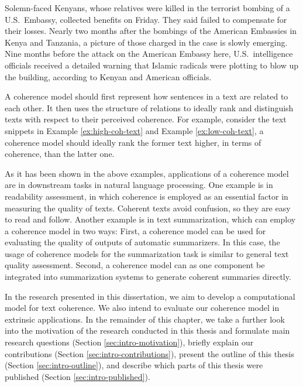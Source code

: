 \begin{examples}
\label{ex:low-coh-text}
Solemn-faced Kenyans, whose relatives were killed in the terrorist bombing of a U.S.\ Embassy, collected benefits on Friday. 
They said failed to compensate for their losses. 
Nearly two months after the bombings of the American Embassies in Kenya and Tanzania, a picture of those charged in the case is slowly emerging. 
Nine months before the attack on the American Embassy here, U.S.\ intelligence officials received a detailed warning that Islamic radicals were plotting to blow up the building, according to Kenyan and American officials. 
\end{examples}

A coherence model should first represent how sentences in a text are related to each other. 
It then uses the structure of relations to ideally rank and distinguish texts with respect to their perceived coherence.  
For example, consider the text snippets in Example \ref{ex:high-coh-text} and Example \ref{ex:low-coh-text}, a coherence model should ideally rank the former text higher, in terms of coherence, than the latter one. 

As it has been shown in the above examples, applications of a coherence model are in downstream tasks in natural language processing. 
One example is in readability assessment, in which coherence is employed as an essential factor in measuring the quality of texts. 
Coherent texts avoid confusion, so they are easy to read and follow. 
Another example is in text summarization, which can employ a coherence model in two ways:   
First, a coherence model can be used for evaluating the quality of outputs of automatic summarizers. 
In this case, the usage of coherence models for the summarization task is similar to general text quality assessment. 
Second, a coherence model can as one component be integrated into summarization systems to generate coherent summaries directly. 

In the research presented in this dissertation, we aim to develop a computational model for text coherence. 
We also intend to evaluate our coherence model in extrinsic applications. 
In the remainder of this chapter, we take a further look into the motivation of the research conducted in this thesis and formulate main research questions (Section \ref{sec:intro-motivation}), briefly explain our contributions (Section \ref{sec:intro-contributions}), present the outline of this thesis (Section \ref{sec:intro-outline}), and describe which parts of this thesis were published (Section \ref{sec:intro-published}). 

